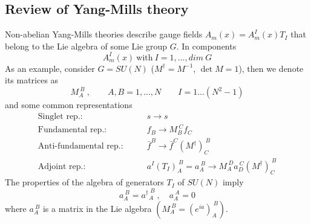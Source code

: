 \documentclass[a4paper,12pt]{article}
\numberwithin{equation}{section}
\numberwithin{exe}{section}
\begin{document}
\subsection{Review of Yang-Mills theory}
Non-abelian Yang-Mills theories describe gauge fields $A_m(x)=A^I_m(x) T_I$ that belong to the Lie algebra of some Lie group $G$. In components 
	\begin{equation}
	A^I_m(x)\ \text{with}\ I=1,\ldots,dim\ G
	\end{equation}
As an example, consider $G = SU(N)$ ($M^\dagger = M^{-1}$, $\det M =1$), then we denote its matrices as
	\begin{equation}
	M_A^{\ B}\ ,\qquad A,B=1,\ldots,N\qquad I=1\ldots (N^2-1)
	\end{equation}
and some common representations
	\begin{align}
	\text{Singlet rep.:}&\qquad s\rightarrow s \\
	\text{Fundamental rep.:}&\qquad f_B\rightarrow M_B^{\ C} f_C \\
	\text{Anti-fundamental rep.:}&\qquad \bar f^B \rightarrow \bar f^C(M^\dagger)_C^{\ B} \\
	\text{Adjoint rep.:}&\qquad a^I (T_I)_A^{\ B} = a_A^{\ B} \rightarrow M_A^{\ D}a_D^{\ C} (M^\dagger)_C^{\ B}
	\end{align}
The properties of the algebra of generators $T_I$ of $SU(N)$ imply
	\begin{equation}
	a_A^{\ B} = {a^\dagger}_A^{\ B}\ ,\quad a_A^{\ A} = 0
	\end{equation}
where $a_A^{\ B}$ is a matrix in the Lie algebra $(M_A^{\ B} = (e^{ia})_A^{\ B})$.
\end{document}
